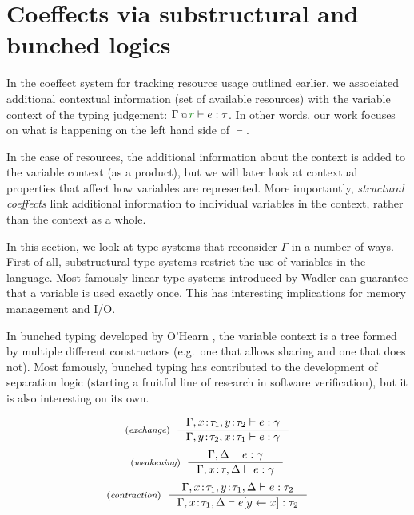 \section{Coeffects via substructural and bunched logics}
\label{sec:path-logic}

In the coeffect system for tracking resource usage outlined earlier, we associated additional
contextual information (set of available resources) with the variable context of the typing
judgement: $\coctx{\Gamma}{\cclrd{r}} \vdash e : \tau$. In other words, our work focuses on
what is happening on the left hand side of $\vdash$.

In the case of resources, the additional information about the context is added to the
variable context (as a product), but we will later look at contextual properties that affect
how variables are represented. More importantly, \emph{structural coeffects} link additional
information to individual variables in the context, rather than the context as a whole.

In this section, we look at type systems that reconsider $\Gamma$ in a number of ways.
First of all, substructural type systems \cite{substruct-attpl-intro} restrict the use of variables
in the language. Most famously linear type systems introduced by Wadler \cite{substruct-linear-change}
can guarantee that a variable is used exactly once. This has interesting implications for memory
management and I/O.

In bunched typing developed by O'Hearn \cite{substruct-bunched}, the variable context is a tree
formed by multiple different constructors (e.g.~one that allows sharing and one that does not).
Most famously, bunched typing has contributed to the development of separation logic
\cite{substruct-separation-logic} (starting a fruitful line of research in software verification),
but it is also interesting on its own.



\begin{figure}
\begin{equation*}
\tyrule{exchange}
  {\Gamma, x\!:\!\tau_1, y\!:\!\tau_2 \vdash e : \gamma}
  {\Gamma, y\!:\!\tau_2, x\!:\!\tau_1 \vdash e : \gamma}
\end{equation*}
\begin{equation*}
\tyrule{weakening}
  {\Gamma, \Delta \vdash e : \gamma}
  {\Gamma, x\!:\!\tau, \Delta \vdash e : \gamma}
\end{equation*}
\begin{equation*}
\tyrule{contraction}
  {\Gamma, x\!:\!\tau_1, y\!:\!\tau_1, \Delta \vdash e : \tau_2}
  {\Gamma, x\!:\!\tau_1, \Delta \vdash \subst{e}{y}{x} : \tau_2}
\end{equation*}

\label{fig:substructural-rules}
\end{figure}

